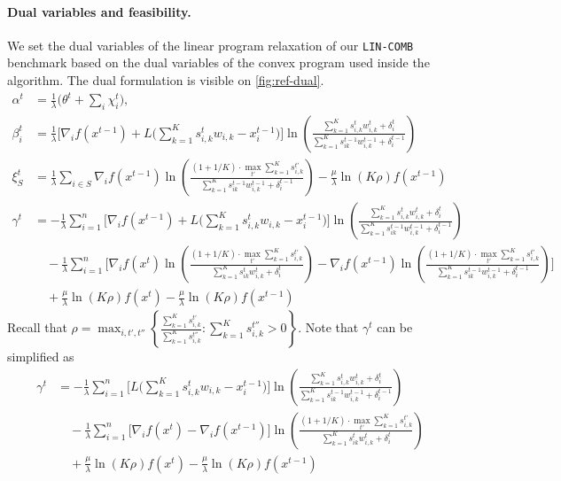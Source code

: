 \paragraph{Dual variables and feasibility.} We set the dual variables of the linear program relaxation of our \texttt{LIN-COMB} benchmark based on the dual variables of the convex program used inside the algorithm. The dual formulation is visible on \cref{fig:ref-dual}.
%
\begin{align*}
    \alpha^{t} &= \frac{1}{\lambda}  \biggl( \theta^{t} + \sum_{i} \chi_{i}^{t} \biggr), \\
    \beta_{i}^{t} &= \frac{1}{\lambda} \biggl[  \nabla_{i} f(x^{t-1}) + L\biggl( \sum_{k=1}^{K} s_{i,k}^{t} w_{i,k}  - x_{i}^{t-1} \biggr) \biggr] \ln \left( \frac{\sum_{k=1}^{K} s_{i,k}^{t} w_{i,k}^{t} + \delta_{i}^{t}}{\sum_{k=1}^{K}  s_{ik}^{t-1}w_{i,k}^{t-1}  + \delta_{i}^{t-1}} \right) \\
    \xi_{S}^{t} &= \frac{1}{\lambda} \sum_{i \in S} \nabla_{i} f(x^{t-1}) \ln \left( \frac{(1 + 1/K) \cdot \max_{t'} \sum_{k=1}^{K} s_{i,k}^{t'}}{\sum_{k=1}^{K}  s_{ik}^{t-1}w_{i,k}^{t-1}  + \delta_{i}^{t-1}} \right) - \frac{\mu}{\lambda} \ln(K\rho)  f(x^{t-1})\\
    \gamma^{t} &= -  \frac{1}{\lambda} \sum_{i=1}^{n} \biggl[  \nabla_{i} f(x^{t-1}) + L\biggl( \sum_{k=1}^{K} s_{i,k}^{t} w_{i,k}  - x_{i}^{t-1} \biggr) \biggr]  \ln \left( \frac{\sum_{k=1}^{K} s_{i,k}^{t} w_{i,k}^{t} + \delta_{i}^{t}}{\sum_{k=1}^{K}  s_{ik}^{t-1}w_{i,k}^{t-1}  + \delta_{i}^{t-1}} \right) \\
        & \quad - \frac{1}{\lambda} \sum_{i=1}^{n} \biggl[ \nabla_{i} f(x^{t}) \ln \left( \frac{(1 + 1/K) \cdot \max_{t'} \sum_{k=1}^{K} s_{i,k}^{t'}}{\sum_{k=1}^{K}  s_{ik}^{t}w_{i,k}^{t}  + \delta_{i}^{t}} \right) -  \nabla_{i} f(x^{t-1}) \ln \left( \frac{(1 + 1/K) \cdot \max_{t'} \sum_{k=1}^{K} s_{i,k}^{t'}}{\sum_{k=1}^{K}  s_{ik}^{t-1}w_{i,k}^{t-1}  + \delta_{i}^{t-1}} \right) \biggr] \\
    & \quad + \frac{\mu}{\lambda} \ln(K\rho) f(x^{t}) - \frac{\mu}{\lambda} \ln(K\rho) f(x^{t-1})
\end{align*}
%
Recall that $\rho = \max_{i, t',t''} \left\{\frac{\sum_{k=1}^{K} s_{i,k}^{t'}}{\sum_{k=1}^{K} s_{i,k}^{t''}} : \sum_{k=1}^{K} s_{i,k}^{t''} > 0 \right\}$.
%
Note that $\gamma^{t}$ can be simplified as
\begin{align*}
    \gamma^{t} &= -  \frac{1}{\lambda} \sum_{i=1}^{n} \biggl[ L\biggl( \sum_{k=1}^{K} s_{i,k}^{t} w_{i,k}  - x_{i}^{t-1} \biggr) \biggr]  \ln \left( \frac{\sum_{k=1}^{K} s_{i,k}^{t} w_{i,k}^{t} + \delta_{i}^{t}}{\sum_{k=1}^{K}  s_{ik}^{t-1}w_{i,k}^{t-1}  + \delta_{i}^{t-1}} \right) \\
        & \quad - \frac{1}{\lambda} \sum_{i=1}^{n} \biggl[ \nabla_{i} f(x^{t}) - \nabla_{i} f(x^{t-1}) \biggr] \ln \left( \frac{(1 + 1/K) \cdot \max_{t'} \sum_{k=1}^{K} s_{i,k}^{t'}}{\sum_{k=1}^{K}  s_{ik}^{t}w_{i,k}^{t}  + \delta_{i}^{t}} \right)  \\
    & \quad + \frac{\mu}{\lambda} \ln(K\rho) f(x^{t}) - \frac{\mu}{\lambda} \ln(K\rho) f(x^{t-1})
\end{align*}

